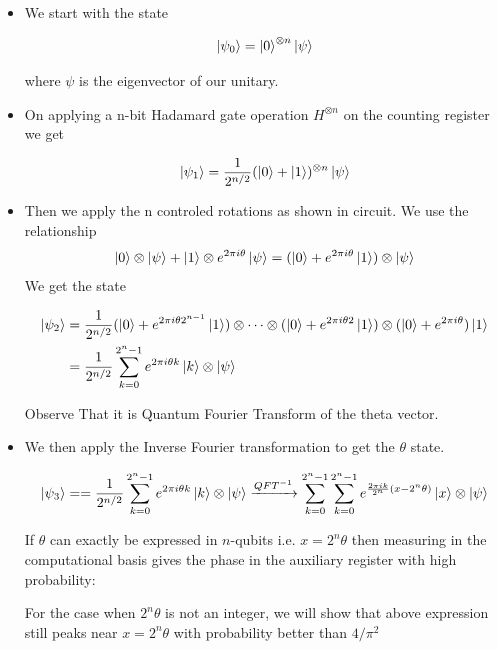 \documentclass[11.5pt, paper=a4]{article}
\theoremstyle{definition}
\numberwithin{theorem}{section}
\begin{document}
\begin{itemize}
    \item We start with the state
    
    $$
    \ket{\psi_0} = \ket{0}^{\otimes n}\ket{\psi}
    $$
    
    where $\psi$ is the eigenvector of our unitary. 
    
    \item On applying a n-bit Hadamard gate operation $H^{\otimes n}$ on the counting register we get
    
    $$
        \ket{\psi_1} = \frac{1}{2^{n/2}} (\ket{0}+\ket{1})^{\otimes n}\ket{\psi}
    $$
    
    \item Then we apply the  n controled rotations as shown in circuit. We use the relationship 
    $$
    \ket{0} \otimes \ket{\psi} + \ket{1} \otimes e^{2\pi i \theta}\ket{\psi} = (\ket{0} + e^{2\pi i \theta}\ket{1})\otimes \ket{\psi}
    $$
    We get the state
    
    $$
    \begin{aligned}
        \ket{\psi_2} &= \frac{1}{2^{n/2}} (\ket{0} + e^{2\pi i \theta 2^{n-1}}\ket{1}) \otimes \dots \otimes (\ket{0} + e^{2\pi i \theta 2}\ket{1})\otimes (\ket{0} + e^{2\pi i \theta})\ket{1} \\
        &= \frac{1}{2^{n/2}} \sum_{k = 0}^{2^n -1 }e^{2\pi i \theta k }\ket{k} \otimes \ket{\psi}
    \end{aligned}
    $$
    
    Observe That it is Quantum Fourier Transform of the theta vector.
    
    \item We then apply the Inverse Fourier transformation to get the $\theta$ state. 
    
    $$
    \ket{\psi_3} = = \frac{1}{2^{n/2}} \sum_{k = 0}^{2^n -1 }e^{2\pi i \theta k }\ket{k} \otimes \ket{\psi} \xrightarrow{QFT^{-1}} \sum_{k = 0}^{2^n -1 } \sum_{k = 0}^{2^n -1 } e^{\frac{2\pi i k}{2^n}(x - 2^n\theta) }\ket{x} \otimes \ket{\psi}
    $$
    
    If $\theta$ can exactly be expressed in $n$-qubits i.e.   $x = 2^n\theta$ then measuring in the computational basis gives the phase in the auxiliary register with high probability:
    
    \par For the case when $2^n \theta$ is not an integer, we will show that above expression still peaks near $x = 2^n\theta$ with probability better than $4/\pi^2$
    

\end{itemize}
\end{document}
